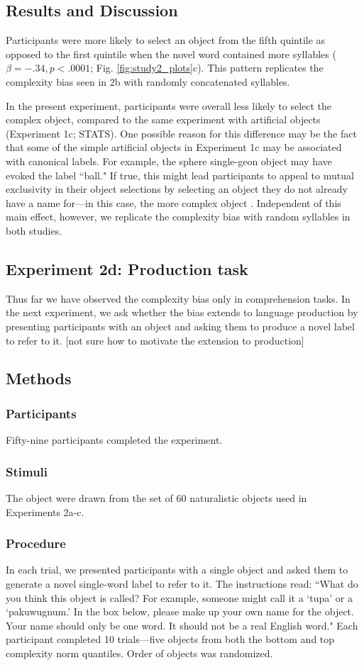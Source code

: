 \documentclass[man]{apa2}
\begin{document}
\subsection{Results and Discussion}
Participants were more likely to select an object from the fifth quintile as opposed to the first quintile when the novel word contained more syllables ($\beta = -.34, p < .0001$; Fig. \ref{fig:study2_plots}c). This pattern replicates the complexity bias seen in 2b with randomly concatenated syllables.  

In the present experiment, participants were overall less likely to select the complex object, compared to the same experiment with artificial objects (Experiment 1c; STATS).  One possible reason for this difference may be the fact that some of the simple artificial objects in Experiment 1c may be associated with canonical labels. For example, the sphere single-geon object may have evoked the label ``ball." If true, this might lead participants to appeal to mutual exclusivity in their object selections by selecting an object they do not already have a name for---in this case, the more complex object \cite{markman1988}. Independent of this main effect, however, we replicate the complexity bias with random syllables in both studies.

\subsection{\textbf{Experiment 2d: Production task}}
Thus far we have observed the complexity bias only in comprehension tasks. In the next experiment, we ask whether  the bias extends to language production by presenting participants with an object and asking them to produce a novel label to refer to it. [not sure how to motivate the extension to production]
\subsection{Methods}
\subsubsection{Participants} Fifty-nine participants completed the experiment.
\subsubsection{Stimuli} The object were drawn from the set of 60 naturalistic objects used in Experiments 2a-c.
\subsubsection{Procedure}
In each trial, we presented participants with a single object and asked them to generate a novel single-word label to refer to it. The instructions read: ``What do you think this object is called? For example, someone might call it a `tupa' or a `pakuwugnum.' In the box below, please make up your own name for the object. Your name should only be one word. It should not be a real English word." Each participant completed 10 trials---five objects from both the bottom and top complexity norm quantiles.  Order of objects was randomized.
\end{document}
